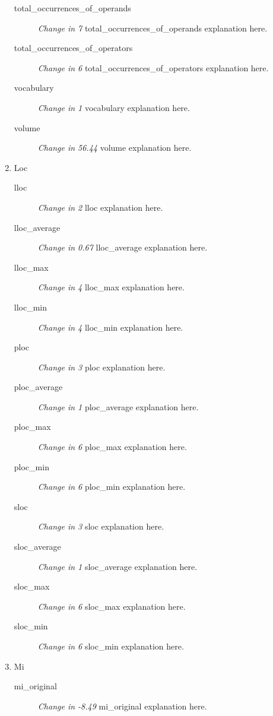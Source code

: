 \begin{enumerate}
\begin{description}
                  \item [total\_occurrences\_of\_operands] \textit{Change in 7} total\_occurrences\_of\_operands explanation here.
                  \item [total\_occurrences\_of\_operators] \textit{Change in 6} total\_occurrences\_of\_operators explanation here.
                  \item [vocabulary] \textit{Change in 1} vocabulary explanation here.
                  \item [volume] \textit{Change in 56.44} volume explanation here.
            \end{description}
      \item Loc
            \begin{description}
                  \item [lloc] \textit{Change in 2} lloc explanation here.
                  \item [lloc\_average] \textit{Change in 0.67} lloc\_average explanation here.
                  \item [lloc\_max] \textit{Change in 4} lloc\_max explanation here.
                  \item [lloc\_min] \textit{Change in 4} lloc\_min explanation here.
                  \item [ploc] \textit{Change in 3} ploc explanation here.
                  \item [ploc\_average] \textit{Change in 1} ploc\_average explanation here.
                  \item [ploc\_max] \textit{Change in 6} ploc\_max explanation here.
                  \item [ploc\_min] \textit{Change in 6} ploc\_min explanation here.
                  \item [sloc] \textit{Change in 3} sloc explanation here.
                  \item [sloc\_average] \textit{Change in 1} sloc\_average explanation here.
                  \item [sloc\_max] \textit{Change in 6} sloc\_max explanation here.
                  \item [sloc\_min] \textit{Change in 6} sloc\_min explanation here.
            \end{description}
      \item Mi
            \begin{description}
                  \item [mi\_original] \textit{Change in -8.49} mi\_original explanation here.

\end{description}
\end{enumerate}
